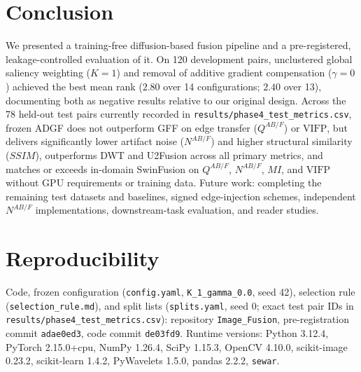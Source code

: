\documentclass[conference]{IEEEtran}
\begin{document}
\section{Conclusion}
We presented a training-free diffusion-based fusion pipeline and a pre-registered, leakage-controlled evaluation of it. On 120 development pairs, unclustered global saliency weighting ($K=1$) and removal of additive gradient compensation ($\gamma=0$) achieved the best mean rank ($2.80$ over 14 configurations; $2.40$ over 13), documenting both as negative results relative to our original design. Across the 78 held-out test pairs currently recorded in \texttt{results/phase4\_test\_metrics.csv}, frozen ADGF does not outperform GFF on edge transfer ($Q^{AB/F}$) or $\mathrm{VIFP}$, but delivers significantly lower artifact noise ($N^{AB/F}$) and higher structural similarity ($SSIM$), outperforms DWT and U2Fusion across all primary metrics, and matches or exceeds in-domain SwinFusion on $Q^{AB/F}$, $N^{AB/F}$, $MI$, and $\mathrm{VIFP}$ without GPU requirements or training data. Future work: completing the remaining test datasets and baselines, signed edge-injection schemes, independent $N^{AB/F}$ implementations, downstream-task evaluation, and reader studies.

\section*{Reproducibility}
Code, frozen configuration (\texttt{config.yaml}, \texttt{K\_1\_gamma\_0.0}, seed 42), selection rule (\texttt{selection\_rule.md}), and split lists (\texttt{splits.yaml}, seed 0; exact test pair IDs in \texttt{results/phase4\_test\_metrics.csv}): repository \texttt{Image\_Fusion}, pre-registration commit \texttt{adae0ed3}, code commit \texttt{de03fd9}. Runtime versions: Python 3.12.4, PyTorch 2.15.0+cpu, NumPy 1.26.4, SciPy 1.15.3, OpenCV 4.10.0, scikit-image 0.23.2, scikit-learn 1.4.2, PyWavelets 1.5.0, pandas 2.2.2, \texttt{sewar}.
\end{document}
